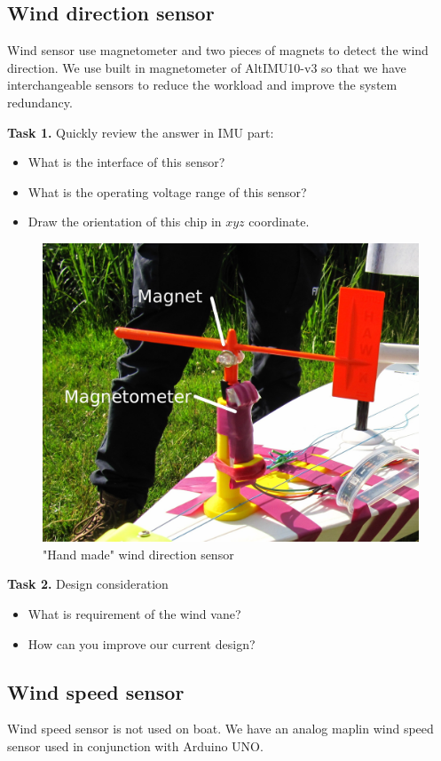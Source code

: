 \documentclass[]{article}
\begin{document}
\subsection{Wind direction sensor}
Wind sensor use magnetometer and two pieces of magnets to detect the wind direction. We use built in magnetometer of AltIMU10-v3 so that we have interchangeable sensors to reduce the workload and improve the system redundancy.


\textbf{Task 1.} Quickly review the answer in IMU part:
  \begin{itemize}
  	\item What is the interface of this sensor?
  	\item What is the operating voltage range of this sensor?
  	\item Draw the orientation of this chip in $xyz$ coordinate.
  \end{itemize}
  
  
\begin{figure}[tbph]
\centering
\includegraphics[width=0.7\linewidth]{windsensor}
\caption{"Hand made" wind direction sensor}
\label{fig:windsensor}
\end{figure}
  
 \textbf{Task 2.} Design consideration
 \begin{itemize}
 	\item What is requirement of the wind vane?
 	\item How can you improve our current design?
 \end{itemize}
  

\subsection{Wind speed sensor}

Wind speed sensor is not used on boat. We have an analog maplin wind speed sensor used in conjunction with Arduino UNO. \\
\end{document}

